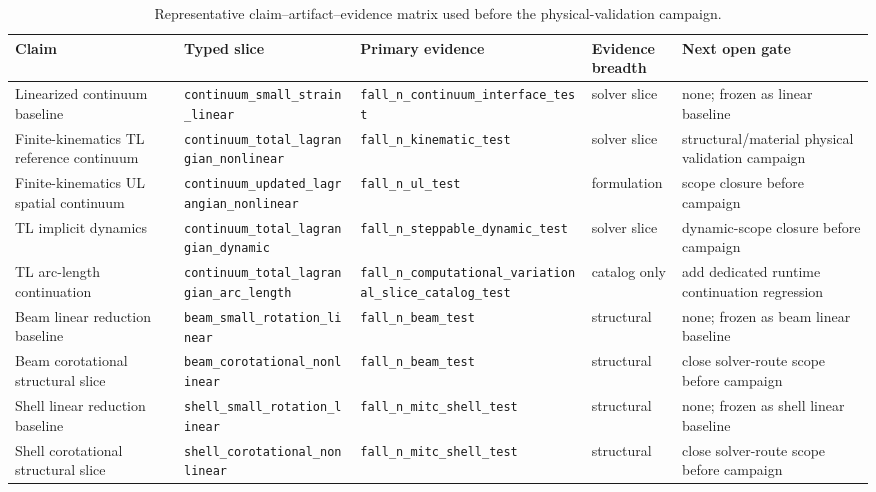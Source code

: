 \begin{table}[htbp]
  \centering
  \caption{Representative claim--artifact--evidence matrix used before the
  physical-validation campaign.}
  \label{tab:stage1-claim-trace}
  \small
  \begin{tabularx}{\textwidth}{@{}p{}p{}p{}p{}X@{}}
    \toprule
    \textbf{Claim} & \textbf{Typed slice} & \textbf{Primary evidence}
    & \textbf{Evidence breadth} & \textbf{Next open gate} \\
    \midrule
    Linearized continuum baseline
    & \texttt{continuum\_small\_strain\_linear}
    & \texttt{fall\_n\_continuum\_interface\_test}
    & solver slice
    & none; frozen as linear baseline \\[1mm]

    Finite-kinematics TL reference continuum
    & \texttt{continuum\_total\_lagrangian\_nonlinear}
    & \texttt{fall\_n\_kinematic\_test}
    & solver slice
    & structural/material physical validation campaign \\[1mm]

    Finite-kinematics UL spatial continuum
    & \texttt{continuum\_updated\_lagrangian\_nonlinear}
    & \texttt{fall\_n\_ul\_test}
    & formulation
    & scope closure before campaign \\[1mm]

    TL implicit dynamics
    & \texttt{continuum\_total\_lagrangian\_dynamic}
    & \texttt{fall\_n\_steppable\_dynamic\_test}
    & solver slice
    & dynamic-scope closure before campaign \\[1mm]

    TL arc-length continuation
    & \texttt{continuum\_total\_lagrangian\_arc\_length}
    & \texttt{fall\_n\_computational\_variational\_slice\_catalog\_test}
    & catalog only
    & add dedicated runtime continuation regression \\[1mm]

    Beam linear reduction baseline
    & \texttt{beam\_small\_rotation\_linear}
    & \texttt{fall\_n\_beam\_test}
    & structural
    & none; frozen as beam linear baseline \\[1mm]

    Beam corotational structural slice
    & \texttt{beam\_corotational\_nonlinear}
    & \texttt{fall\_n\_beam\_test}
    & structural
    & close solver-route scope before campaign \\[1mm]

    Shell linear reduction baseline
    & \texttt{shell\_small\_rotation\_linear}
    & \texttt{fall\_n\_mitc\_shell\_test}
    & structural
    & none; frozen as shell linear baseline \\[1mm]

    Shell corotational structural slice
    & \texttt{shell\_corotational\_nonlinear}
    & \texttt{fall\_n\_mitc\_shell\_test}
    & structural
    & close solver-route scope before campaign \\
    \bottomrule
  \end{tabularx}
\end{table}

